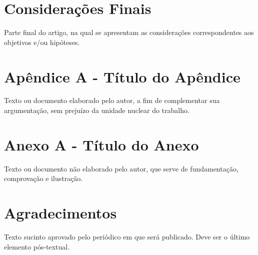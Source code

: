 \documentclass[a4paper, 12pt, twoside]{article}
\begin{document}

\section{Considerações Finais}

\par [OBRIGATÓRIO] Parte final do artigo, na qual se apresentam as considerações correspondentes aos objetivos e/ou hipóteses.





\section*{Apêndice A - Título do Apêndice} 

\par [OPCIONAL] Texto ou documento elaborado pelo autor, a fim de complementar sua argumentação, sem prejuízo da unidade nuclear do trabalho.

\section*{Anexo A - Título do Anexo}

\par [OPCIONAL] Texto ou documento não elaborado pelo autor, que serve de fundamentação, comprovação e ilustração.

\section*{Agradecimentos}

\par [OPCIONAL] Texto sucinto aprovado pelo periódico em que será publicado. Deve ser o último elemento pós-textual.
\end{document}
